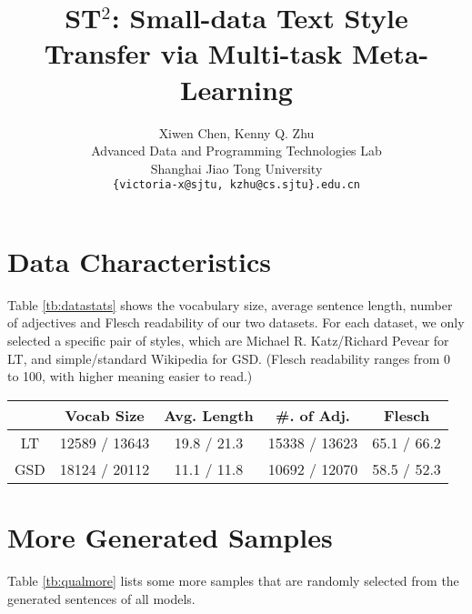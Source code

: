 \documentclass[11pt,a4paper]{article}
\title{ST$^2$: Small-data Text Style Transfer via Multi-task Meta-Learning}
\author{Xiwen Chen, Kenny Q. Zhu \\
	Advanced Data and Programming Technologies Lab \\
	Shanghai Jiao Tong University \\
	\texttt{\{victoria-x@sjtu, kzhu@cs.sjtu\}.edu.cn} \\
}
\date{}
\begin{document}
\appendix
\section{Data Characteristics}
\label{ap:datastats}

Table \ref{tb:datastats} shows the vocabulary size, average sentence length, number of adjectives and Flesch readability of our two datasets. For each dataset, we only selected a specific pair of styles, which are Michael R. Katz/Richard Pevear for LT, and simple/standard Wikipedia for GSD. (Flesch readability ranges from 0 to 100, with higher meaning easier to read.)

\begin{table*}[th]\footnotesize
	\centering
	\begin{tabular}{c|cccc}
		& Vocab Size & Avg. Length & \#. of Adj. & Flesch \\
		\hline
		LT & 12589 / 13643 & 19.8 / 21.3 & 15338 / 13623 & 65.1 / 66.2 \\
		GSD & 18124 / 20112 & 11.1 / 11.8 & 10692 / 12070 & 58.5 / 52.3
	\end{tabular}
	\caption{Dataset characteristics.}\label{tb:datastats}
\end{table*}

\section{More Generated Samples}

Table \ref{tb:qualmore} lists some more samples that are randomly selected from the generated sentences of all models.
\end{document}
